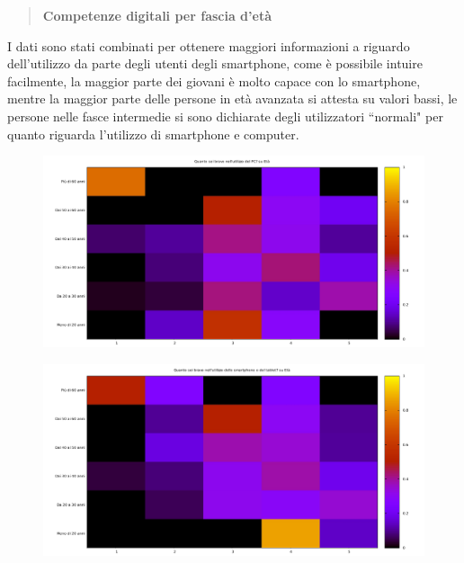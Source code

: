 \begin{quote}
	\textbf{Competenze digitali per fascia d'età}
\end{quote}
I dati sono stati combinati per ottenere maggiori informazioni a riguardo
dell'utilizzo da parte degli utenti degli smartphone, come è possibile intuire
facilmente, la maggior parte dei giovani è molto capace con lo smartphone,
mentre la maggior parte delle persone in età avanzata si attesta su valori
bassi, le persone nelle fasce intermedie si sono dichiarate degli utilizzatori
``normali" per quanto riguarda l'utilizzo di smartphone e computer.
\begin{figure}[H]
\centering
	\includegraphics[width=\textwidth]{img/heatmap_pc_eta}
\end{figure}
\begin{figure}[H]
	\includegraphics[width=\textwidth]{img/heatmap_smartphone_eta}
\end{figure}


